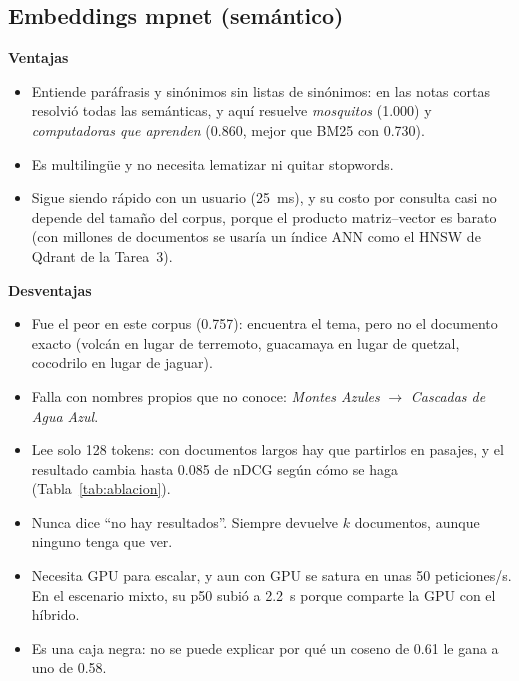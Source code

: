\documentclass[11pt,letterpaper]{article}
\begin{document}
\subsection*{Embeddings mpnet (semántico)}
\textbf{Ventajas}
\begin{itemize}[nosep]
\item Entiende paráfrasis y sinónimos sin listas de sinónimos: en las notas cortas resolvió todas las semánticas, y aquí resuelve \emph{mosquitos} (1.000) y \emph{computadoras que aprenden} (0.860, mejor que BM25 con 0.730).
\item Es multilingüe y no necesita lematizar ni quitar stopwords.
\item Sigue siendo rápido con un usuario (25~ms), y su costo por consulta casi no depende del tamaño del corpus, porque el producto matriz--vector es barato (con millones de documentos se usaría un índice ANN como el HNSW de Qdrant de la Tarea~3).
\end{itemize}
\textbf{Desventajas}
\begin{itemize}[nosep]
\item Fue el peor en este corpus (0.757): encuentra el tema, pero no el documento exacto (volcán en lugar de terremoto, guacamaya en lugar de quetzal, cocodrilo en lugar de jaguar).
\item Falla con nombres propios que no conoce: \emph{Montes Azules} $\to$ \emph{Cascadas de Agua Azul}.
\item Lee solo 128 tokens: con documentos largos hay que partirlos en pasajes, y el resultado cambia hasta 0.085 de nDCG según cómo se haga (Tabla~\ref{tab:ablacion}).
\item Nunca dice ``no hay resultados''. Siempre devuelve $k$ documentos, aunque ninguno tenga que ver.
\item Necesita GPU para escalar, y aun con GPU se satura en unas 50 peticiones/s. En el escenario mixto, su p50 subió a 2.2~s porque comparte la GPU con el híbrido.
\item Es una caja negra: no se puede explicar por qué un coseno de 0.61 le gana a uno de 0.58.
\end{itemize}
\end{document}
